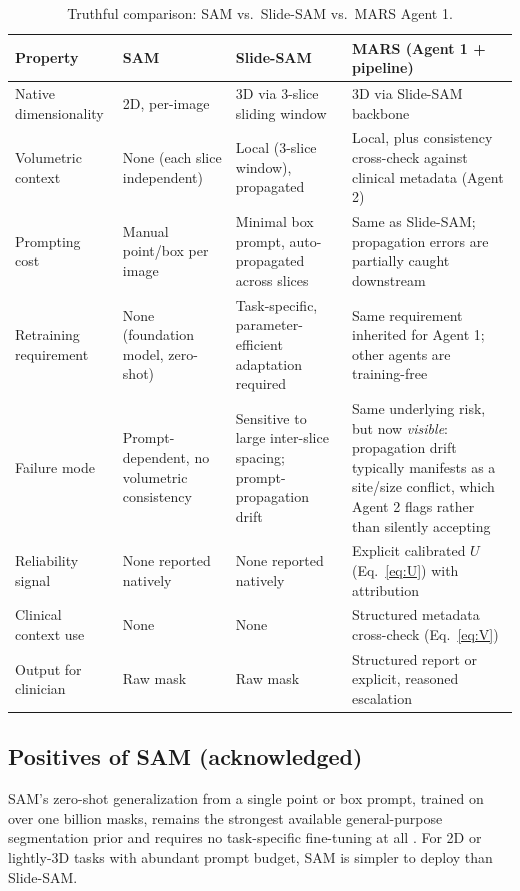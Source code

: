 \documentclass[11pt,a4paper]{article}
\begin{document}
\begin{table}[htbp]
\centering
\caption{Truthful comparison: SAM \cite{sam} vs.\ Slide-SAM \cite{slidesam} vs.\ MARS Agent 1.}
\label{tab:samcompare}
\small
\begin{tabular}{p{2.6cm}p{3.5cm}p{3.5cm}p{3.7cm}}
\toprule
\textbf{Property} & \textbf{SAM} & \textbf{Slide-SAM} & \textbf{MARS (Agent 1 + pipeline)} \\
\midrule
Native dimensionality & 2D, per-image & 3D via 3-slice sliding window & 3D via Slide-SAM backbone \\
Volumetric context & None (each slice independent) & Local (3-slice window), propagated & Local, plus consistency cross-check against clinical metadata (Agent 2) \\
Prompting cost & Manual point/box per image & Minimal box prompt, auto-propagated across slices & Same as Slide-SAM; propagation errors are partially caught downstream \\
Retraining requirement & None (foundation model, zero-shot) & Task-specific, parameter-efficient adaptation required & Same requirement inherited for Agent 1; other agents are training-free \\
Failure mode & Prompt-dependent, no volumetric consistency & Sensitive to large inter-slice spacing; prompt-propagation drift & Same underlying risk, but now \emph{visible}: propagation drift typically manifests as a site/size conflict, which Agent 2 flags rather than silently accepting \\
Reliability signal & None reported natively & None reported natively & Explicit calibrated $U$ (Eq.~\ref{eq:U}) with attribution \\
Clinical context use & None & None & Structured metadata cross-check (Eq.~\ref{eq:V}) \\
Output for clinician & Raw mask & Raw mask & Structured report or explicit, reasoned escalation \\
\bottomrule
\end{tabular}
\end{table}

\subsection{Positives of SAM (acknowledged)}
SAM's zero-shot generalization from a single point or box prompt, trained on over one billion masks, remains the strongest available general-purpose segmentation prior and requires no task-specific fine-tuning at all \cite{sam}. For 2D or lightly-3D tasks with abundant prompt budget, SAM is simpler to deploy than Slide-SAM.
\end{document}
